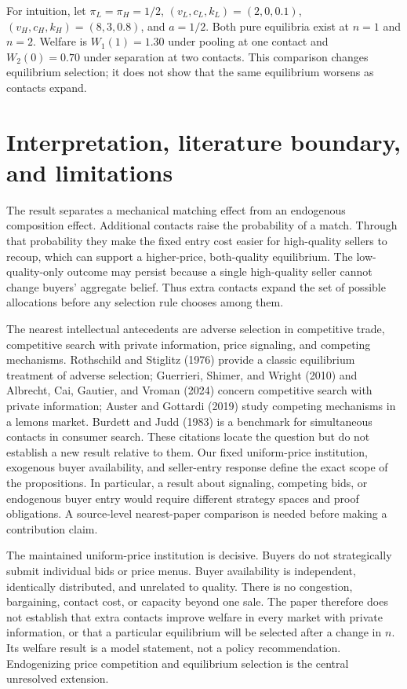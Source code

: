 \documentclass[11pt]{article}
\begin{document}
For intuition, let $\pi_L=\pi_H=1/2$, $(v_L,c_L,k_L)=(2,0,0.1)$, $(v_H,c_H,k_H)=(8,3,0.8)$, and $a=1/2$. Both pure equilibria exist at $n=1$ and $n=2$. Welfare is $W_1(1)=1.30$ under pooling at one contact and $W_2(0)=0.70$ under separation at two contacts. This comparison changes equilibrium selection; it does not show that the same equilibrium worsens as contacts expand.

\section{Interpretation, literature boundary, and limitations}\label{sec:limits}

The result separates a mechanical matching effect from an endogenous composition effect. Additional contacts raise the probability of a match. Through that probability they make the fixed entry cost easier for high-quality sellers to recoup, which can support a higher-price, both-quality equilibrium. The low-quality-only outcome may persist because a single high-quality seller cannot change buyers' aggregate belief. Thus extra contacts expand the set of possible allocations before any selection rule chooses among them.

The nearest intellectual antecedents are adverse selection in competitive trade, competitive search with private information, price signaling, and competing mechanisms. Rothschild and Stiglitz (1976) provide a classic equilibrium treatment of adverse selection; Guerrieri, Shimer, and Wright (2010) and Albrecht, Cai, Gautier, and Vroman (2024) concern competitive search with private information; Auster and Gottardi (2019) study competing mechanisms in a lemons market. Burdett and Judd (1983) is a benchmark for simultaneous contacts in consumer search. These citations locate the question but do not establish a new result relative to them. Our fixed uniform-price institution, exogenous buyer availability, and seller-entry response define the exact scope of the propositions. In particular, a result about signaling, competing bids, or endogenous buyer entry would require different strategy spaces and proof obligations. A source-level nearest-paper comparison is needed before making a contribution claim.

The maintained uniform-price institution is decisive. Buyers do not strategically submit individual bids or price menus. Buyer availability is independent, identically distributed, and unrelated to quality. There is no congestion, bargaining, contact cost, or capacity beyond one sale. The paper therefore does not establish that extra contacts improve welfare in every market with private information, or that a particular equilibrium will be selected after a change in $n$. Its welfare result is a model statement, not a policy recommendation. Endogenizing price competition and equilibrium selection is the central unresolved extension.
\end{document}
